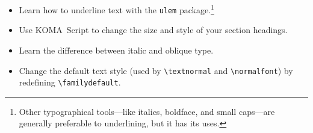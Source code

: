 \exercises{}
\begin{itemize}
\item Learn how to underline text with the \texttt{ulem}
    package.\punckern\footnote{Other typographical tools---like italics,
    boldface, and small caps---are generally preferable to underlining,
    but it has its uses.}
\item Use KOMA~Script to change the size and style of your section headings.
\item Learn the difference between italic and oblique type.
\item Change the default text style
    (used by \verb|\textnormal| and \verb|\normalfont|) by redefining
    \verb|\familydefault|.
\end{itemize}
